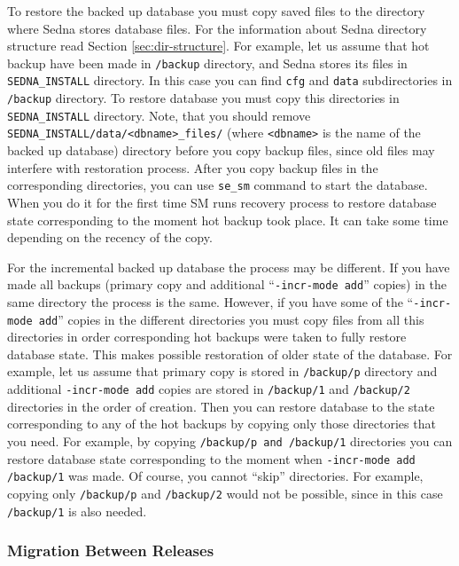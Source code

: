 \documentclass[a4paper,12pt]{article}
\begin{document}
To restore the backed up database you must copy saved files to the directory
where Sedna stores database files. For the information about Sedna directory
structure read Section \ref{sec:dir-structure}. For example, let us assume that
hot backup have been made in \verb!/backup! directory, and Sedna stores its
files in \verb!SEDNA_INSTALL! directory. In this case you can find \verb!cfg!
and \verb!data! subdirectories in \verb!/backup! directory. To restore database
you must copy this directories in \verb!SEDNA_INSTALL! directory. Note, that you
should remove \verb!SEDNA_INSTALL/data/<dbname>_files/! (where \verb!<dbname>!
is the name of the backed up database) directory before you copy backup files,
since old files may interfere with restoration process. After you copy backup
files in the corresponding directories, you can use \verb!se_sm! command to
start the database. When you do it for the first time SM runs recovery process
to restore database state corresponding to the moment hot backup took place. It
can take some time depending on the recency of the copy.

For the incremental backed up database the process may be different. If you have
made all backups (primary copy and additional ``\verb!-incr-mode add!'' copies)
in the same directory the process is the same. However, if you have some of the
``\verb!-incr-mode add!'' copies in the different directories you must copy
files from all this directories in order corresponding hot backups were taken to
fully restore database state. This makes possible restoration of older state of
the database. For example, let us assume that primary copy is stored in
\verb!/backup/p! directory and additional \verb!-incr-mode add! copies are
stored in \verb!/backup/1! and \verb!/backup/2! directories in the order of
creation. Then you can restore database to the state corresponding to any of the
hot backups by copying only those directories that you need. For example, by
copying \verb!/backup/p and !\verb!/backup/1! directories you can restore
database state corresponding to the moment when \verb!-incr-mode add /backup/1!
was made. Of course, you cannot ``skip'' directories. For example, copying only
\verb!/backup/p! and \verb!/backup/2! would not be possible, since in this case
\verb!/backup/1! is also needed.

\subsubsection{Migration Between Releases}
\label{sec:release-migr}
\end{document}
